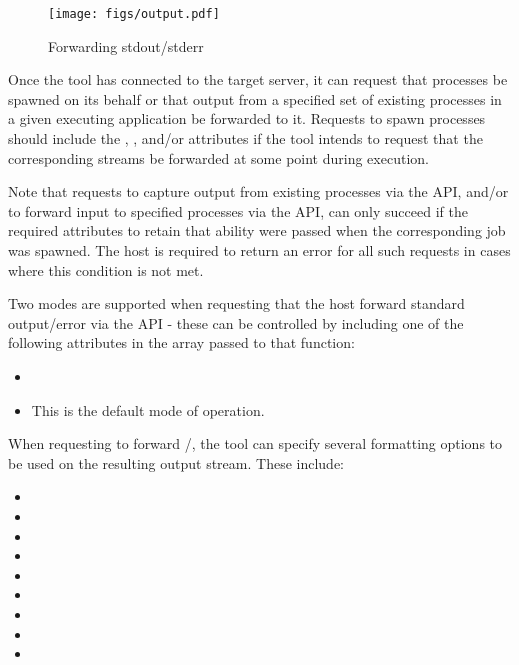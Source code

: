 \begingroup
\begin{figure*}[ht!]
  \begin{center}
    \texttt{[image: figs/output.pdf]}
  \end{center}
  \caption{Forwarding stdout/stderr}
  \label{fig:stdouterr}
\end{figure*}
\endgroup

Once the tool has connected to the target server, it can request that
processes be spawned on its behalf or that output from a specified set of
existing processes in a given executing application be forwarded to it.
Requests to spawn processes should include the ,
, and/or  attributes if the
tool intends to request that the corresponding streams be forwarded at some
point during execution.

Note that requests to capture output from existing processes via the
 \ac{API}, and/or to forward input to specified
processes via the  \ac{API}, can only succeed if the
required attributes to retain that ability were passed when the corresponding
job was spawned. The host is required to return an error for all such requests
in cases where this condition is not met.

Two modes are supported when requesting that the host forward standard output/error via the  \ac{API} - these can be controlled by including one of the following attributes in the  array passed to that function:

\begin{itemize}
    \item {}
    \item {}This is the default mode of operation.
    \pasteAttributeItemEnd{}
\end{itemize}

When requesting to forward /, the tool can specify several formatting options to be used on the resulting output stream. These include:

\begin{itemize}
    \item {}
    \item {}
    \item {}
    \item {}
    \item {}
    \item {}
    \item {}
    \item {}
    \item {}

\end{itemize}


